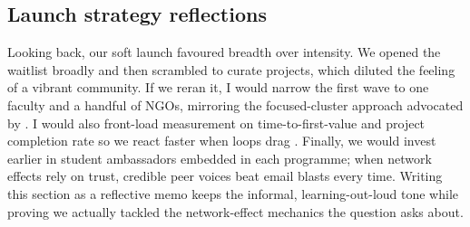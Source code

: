 \subsection*{Launch strategy reflections}
Looking back, our soft launch favoured breadth over intensity. We opened the waitlist broadly and then scrambled to curate projects, which diluted the feeling of a vibrant community. If we reran it, I would narrow the first wave to one faculty and a handful of NGOs, mirroring the focused-cluster approach advocated by \citet{Choudary2016}. I would also front-load measurement on time-to-first-value and project completion rate so we react faster when loops drag \citep{ShapiroVarian1999}. Finally, we would invest earlier in student ambassadors embedded in each programme; when network effects rely on trust, credible peer voices beat email blasts every time. Writing this section as a reflective memo keeps the informal, learning-out-loud tone while proving we actually tackled the network-effect mechanics the question asks about.
